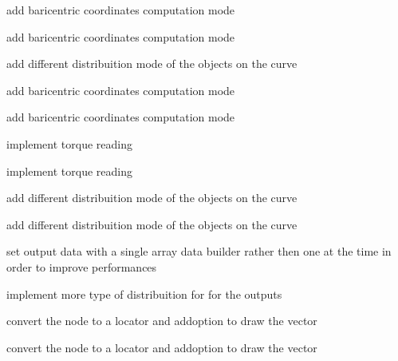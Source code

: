 
\begin{DoxyRefList}
\item[\label{todo__todo000001}%
\hypertarget{todo__todo000001}{}%
Class \hyperlink{class_m_g__cache_value}{M\-G\-\_\-cache\-Value} ]add baricentric coordinates computation mode

add baricentric coordinates computation mode 
\item[\label{todo__todo000006}%
\hypertarget{todo__todo000006}{}%
Class \hyperlink{class_m_g__curve_point}{M\-G\-\_\-curve\-Point} ]add different distribuition mode of the objects on the curve 
\item[\label{todo__todo000002}%
\hypertarget{todo__todo000002}{}%
Class \hyperlink{class_m_g__poly_rivet}{M\-G\-\_\-poly\-Rivet} ]add baricentric coordinates computation mode

add baricentric coordinates computation mode 
\item[\label{todo__todo000003}%
\hypertarget{todo__todo000003}{}%
Class \hyperlink{class_m_g__pose_reader}{M\-G\-\_\-pose\-Reader} ]implement torque reading

implement torque reading 
\item[\label{todo__todo000004}%
\hypertarget{todo__todo000004}{}%
Class \hyperlink{class_m_g__spline_path}{M\-G\-\_\-spline\-Path} ]add different distribuition mode of the objects on the curve

add different distribuition mode of the objects on the curve 
\item[\label{todo__todo000011}%
\hypertarget{todo__todo000011}{}%
Class \hyperlink{class_m_g__twist}{M\-G\-\_\-twist} ]set output data with a single array data builder rather then one at the time in order to improve performances 

implement more type of distribuition for for the outputs 
\item[\label{todo__todo000010}%
\hypertarget{todo__todo000010}{}%
Class \hyperlink{class_m_g__vector}{M\-G\-\_\-vector} ]convert the node to a locator and addoption to draw the vector

convert the node to a locator and addoption to draw the vector
\end{DoxyRefList}